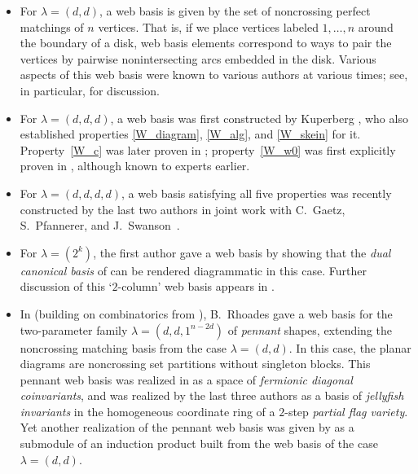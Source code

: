 \documentclass[ALCO, Unicode]{cedram}
\numberwithin{equation}{section}
\begin{document}
\begin{itemize}
    \item 
For $\lambda = (d,d)$, a web basis is given by the set of noncrossing perfect matchings of $n$ vertices. That is, if we place vertices labeled $1, \dots, n$ around the boundary of a disk, web basis elements correspond to ways to pair the vertices by pairwise nonintersecting arcs embedded in the disk. Various aspects of this web basis were known to various authors at various times; see, in particular, \cite{Kung.Rota, Kuperberg, Patrias.Pechenik:evacuation, Petersen.Pylyavskyy.Rhoades, Rhoades:thesis, Temperley.Lieb} for discussion.

\item For $\lambda =(d,d,d)$, a web basis was first constructed by Kuperberg \cite{Kuperberg}, who also established properties \ref{W_diagram}, \ref{W_alg}, and \ref{W_skein} for it. Property~\ref{W_c} was later proven in \cite{Petersen.Pylyavskyy.Rhoades}; property~\ref{W_w0} was first explicitly proven in \cite{Patrias.Pechenik:evacuation}, although known to experts earlier.

\item For $\lambda =(d,d,d,d)$, a web basis satisfying all five properties was recently constructed by the last two authors in joint work with C.~Gaetz, S.~Pfannerer, and J.~Swanson~\cite{Gaetz.Pechenik.Pfannerer.Striker.Swanson:SL4}.

\item For $\lambda = (2^k)$, the first author \cite{Fraser:2column} gave a web basis by showing that the \emph{dual canonical basis} of \cite{Lusztig} can be rendered diagrammatic in this case. Further discussion of this `$2$-column' web basis appears in \cite{Gaetz.Pechenik.Pfannerer.Striker.Swanson:2column}.

\item In \cite{Rhoades:skein} (building on combinatorics from \cite{Pechenik:CSP}), B.~Rhoades gave a web basis for the two-parameter family $\lambda = (d,d,1^{n-2d})$ of \emph{pennant} shapes, extending the noncrossing matching basis from the case $\lambda = (d,d)$. In this case, the planar diagrams are noncrossing set partitions without singleton blocks. This pennant web basis was realized in \cite{Kim.Rhoades} as a space of \emph{fermionic diagonal coinvariants}, and was realized by the last three authors \cite{Patrias.Pechenik.Striker} as a basis of {\sl jellyfish invariants} in the homogeneous coordinate ring of a $2$-step \emph{partial flag variety}. Yet another realization of the pennant web basis was given by \cite{Kim:embedding} as a submodule of an induction product built from the web basis of the case $\lambda = (d,d)$.
\end{itemize}
\end{document}
